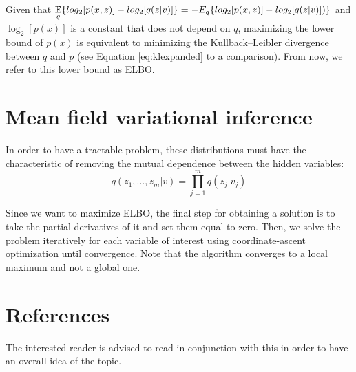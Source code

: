 Given that $ \displaystyle \operatorname*{\mathbb{E}}_q \{log_2[p(x,z)] - log_2[q(z | v)]\} = - E_q \{ log_2[p(x,z)] -log_2[q(z | v)]) \}$
and $\log_2[p(x)]$ is a constant that does not depend on $q$,
maximizing the lower bound of $p(x)$ is equivalent to minimizing the Kullback–Leibler divergence between $q$ and $p$ (see Equation \ref{eq:klexpanded} to a comparison).
From now, we refer to this lower bound as ELBO.

\section{Mean field variational inference}
In order to have a tractable problem, these distributions must have the characteristic
of removing the mutual dependence between the hidden variables:
$$ q(z_1, ..., z_m| v) = \prod_{j=1}^m q(z_j | v_j) $$

Since we want to maximize ELBO,
the final step for obtaining a solution is to take the partial derivatives of it and set them equal to zero.
Then, we solve the problem iteratively for each variable of interest using coordinate-ascent optimization until convergence.
Note that the algorithm converges to a local maximum and not a global one.

\section{References}
The interested reader is advised to read \cite{Blei_2017} in conjunction with this in order to have an overall idea of the topic.